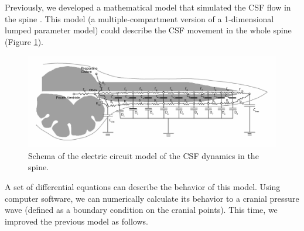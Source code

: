 \documentclass[fleqn,10pt]{wlscirep}
\begin{document}
Previously, we developed a mathematical model that simulated the CSF flow
in the spine \cite{chang2003hypothesis, chang2004theoretical}. This model (a
multiple-compartment version of a 1-dimensional lumped parameter model)
could describe the CSF movement in the whole spine (Figure \ref{fig:model}).

\begin{figure}[ht]
    \centering
    \includegraphics[width=\textwidth]{ps_circuit_schema.jpg}
    \caption{Schema of the electric circuit model of the CSF dynamics in the
    spine.}
    \label{fig:model}
\end{figure}

A set of differential equations can describe the behavior of this model.
Using computer software, we can numerically calculate its behavior to a
cranial pressure wave (defined as a boundary condition on the cranial
points).  This time, we improved the previous model as follows.
\end{document}
